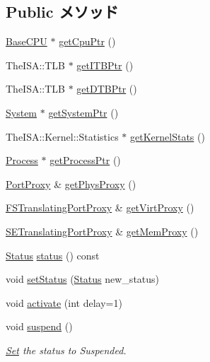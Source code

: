 \subsection*{Public メソッド}
\begin{DoxyCompactItemize}
\item 
\hyperlink{classBaseCPU_1_1BaseCPU}{BaseCPU} $\ast$ \hyperlink{classOzoneCPU_1_1OzoneTC_a55c840745aa3c52362144a0ef54d175c}{getCpuPtr} ()
\item 
TheISA::TLB $\ast$ \hyperlink{classOzoneCPU_1_1OzoneTC_a95b7e95d0558cd03d69613142fff9137}{getITBPtr} ()
\item 
TheISA::TLB $\ast$ \hyperlink{classOzoneCPU_1_1OzoneTC_a2fe6a07c44bc2a4d83b86bea605ba971}{getDTBPtr} ()
\item 
\hyperlink{classSystem}{System} $\ast$ \hyperlink{classOzoneCPU_1_1OzoneTC_af7bdb56e0088b380302741ad9008f321}{getSystemPtr} ()
\item 
TheISA::Kernel::Statistics $\ast$ \hyperlink{classOzoneCPU_1_1OzoneTC_a3faa5e314c06241296ab582bb891a06a}{getKernelStats} ()
\item 
\hyperlink{classProcess}{Process} $\ast$ \hyperlink{classOzoneCPU_1_1OzoneTC_a4b26cb784639047bab9de2b306955c4b}{getProcessPtr} ()
\item 
\hyperlink{classPortProxy}{PortProxy} \& \hyperlink{classOzoneCPU_1_1OzoneTC_a01ed2104c846a24a0e18594d3a2f7de9}{getPhysProxy} ()
\item 
\hyperlink{classFSTranslatingPortProxy}{FSTranslatingPortProxy} \& \hyperlink{classOzoneCPU_1_1OzoneTC_ac7399661f9073ba4ec121b87c782924b}{getVirtProxy} ()
\item 
\hyperlink{classSETranslatingPortProxy}{SETranslatingPortProxy} \& \hyperlink{classOzoneCPU_1_1OzoneTC_ab07f5af63c9d22e504dfe620c0a07228}{getMemProxy} ()
\item 
\hyperlink{classThreadContext_a67a0db04d321a74b7e7fcfd3f1a3f70b}{Status} \hyperlink{classOzoneCPU_1_1OzoneTC_a2ad9e92a82d6f783b3061584729c2f4a}{status} () const 
\item 
void \hyperlink{classOzoneCPU_1_1OzoneTC_acdf331c877974ed8697216475a21998d}{setStatus} (\hyperlink{classThreadContext_a67a0db04d321a74b7e7fcfd3f1a3f70b}{Status} new\_\-status)
\item 
void \hyperlink{classOzoneCPU_1_1OzoneTC_a19d10e434761f745cf27de72713589bc}{activate} (int delay=1)
\item 
void \hyperlink{classOzoneCPU_1_1OzoneTC_a3605b58fb45d69d498721bc2f2a14b1c}{suspend} ()
\begin{DoxyCompactList}\small\item\em \hyperlink{classSet}{Set} the status to Suspended. \item\end{DoxyCompactList}\item 

\end{DoxyCompactItemize}
